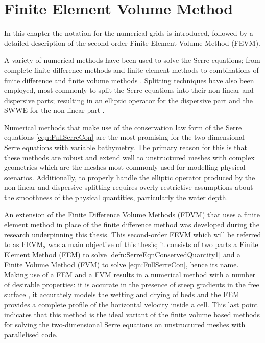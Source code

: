 \chapter{Finite Element Volume Method}
\label{chp:HFVMMethod}
In this chapter the notation for the numerical grids is introduced, followed by a detailed description of the second-order Finite Element Volume Method (FEVM).

A variety of numerical methods have been used to solve the Serre equations; from complete finite difference methods \cite{Cienfuegos-etal-2006-1217,El-etal-2006} and finite element methods \cite{Mitsotakis-etal-2014,Li-2014-169,Mitsotakis-etal-2017} to combinations of finite difference and finite volume methods \cite{Hank-etal-2010-2034,Zoppou-etal-2017}. Splitting techniques have also been employed, most commonly to split the Serre equations into their non-linear and dispersive parts; resulting in an elliptic operator for the dispersive part and the SWWE for the non-linear part \cite{Bradford-Sanders-2002-953,Dutykh-etal-2013-761,Filippini-etal-2016-381}. 

Numerical methods that make use of the conservation law form of the Serre equations \eqref{eqn:FullSerreCon} \cite{Hank-etal-2010-2034,Li-2014-169,Zoppou-etal-2017} are the most promising for the two dimensional Serre equations with variable bathymetry. The primary reason for this is that these methods are robust and extend well to unstructured meshes with complex geometries which are the meshes most commonly used for modelling physical scenarios. Additionally, to properly handle the elliptic operator produced by the non-linear and dispersive splitting requires overly restrictive assumptions about the smoothness of the physical quantities, particularly the water depth. 

An extension of the Finite Difference Volume Methods (FDVM) \cite{Hank-etal-2010-2034,Zoppou-etal-2017} that uses a finite element method in place of the finite difference method was developed during the research underpinning this thesis. This second-order FEVM which will be referred to as $\text{FEVM}_2$ was a main objective of this thesis; it consists of two parts a Finite Element Method (FEM) to solve \eqref{defn:SerreEqnConservedQuantity1} and a Finite Volume Method (FVM) to solve \eqref{eqn:FullSerreCon}, hence its name. Making use of a FEM and a FVM results in a numerical method with a number of desirable properties: it is accurate in the presence of steep gradients in the free surface \cite{Pitt-2018-61}, it accurately models the wetting and drying of beds and the FEM provides a complete profile of the horizontal velocity inside a cell. This last point indicates that this method is the ideal variant of the finite volume based methods \cite{Zoppou-etal-2017} for solving the two-dimensional Serre equations on unstructured meshes with parallelised code.
 
